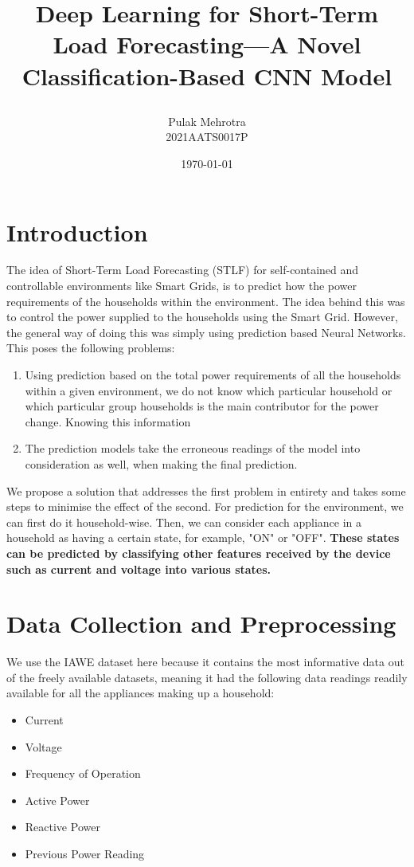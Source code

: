 \documentclass{report}
\title{
    \begin{center}
        \Huge\textbf{Deep Learning for Short-Term Load
Forecasting—A Novel Classification-Based CNN Model}\\[1ex]
          \end{center}
}
\author{Pulak Mehrotra\\2021AATS0017P}
\date{\today}
\begin{document}
\maketitle

\tableofcontents

\newpage %

\section{Introduction}

The idea of Short-Term Load Forecasting (STLF) for self-contained and controllable environments like Smart Grids, is to predict how the power requirements of the households within the environment. The idea behind this was to control the power supplied to the households using the Smart Grid. However, the general way of doing this was simply using prediction based Neural Networks. This poses the following problems:

\begin{enumerate}
    \item Using prediction based on the total power requirements of all the households within a given environment, we do not know which particular household or which particular group households is the main contributor for the power change. Knowing this information
    
    \item The prediction models take the erroneous readings of the model into consideration as well, when making the final prediction.
\end{enumerate} 

We propose a solution that addresses the first problem in entirety and takes some steps to minimise the effect of the second. For prediction for the environment, we can first do it household-wise. Then, we can consider each appliance in a household as having a certain state, for example, "ON" or "OFF". \textbf{These states can be predicted by classifying other features received by the device such as current and voltage into various states.}

\section{Data Collection and Preprocessing}

We use the IAWE dataset here because it contains the most informative data out of the freely available datasets, meaning it had the following data readings readily available for all the appliances making up a household:
\begin{itemize}
    \item Current
    \item Voltage
    \item Frequency of Operation
    \item Active Power
    \item Reactive Power
    \item Previous Power Reading
\end{itemize}
\end{document}
